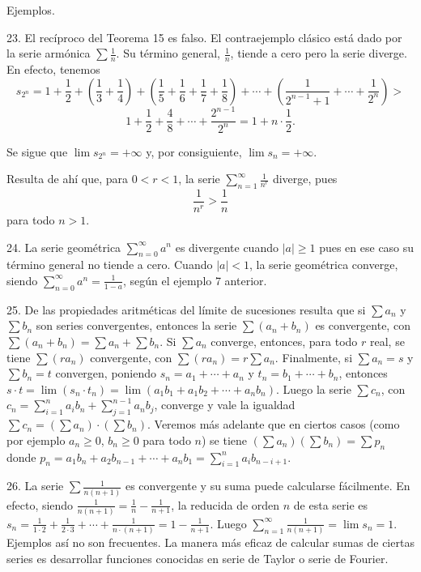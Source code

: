 \documentclass[12pt,oneside]{book}
\begin{document}
Ejemplos.

23. El recíproco del Teorema 15 es falso. El contraejemplo clásico está dado por la serie armónica \(\sum \frac{1}{n}\). Su término general, \(\frac{1}{n}\), tiende a cero pero la serie diverge. En efecto, tenemos
\[
s_{2^n} = 1 + \frac{1}{2} + \left( \frac{1}{3} + \frac{1}{4} \right)
+ \left( \frac{1}{5} + \frac{1}{6} + \frac{1}{7} + \frac{1}{8} \right) + \cdots + \left( \frac{1}{2^{n-1} + 1} + \cdots + \frac{1}{2^n} \right) >
\]
\[
1 + \frac{1}{2} + \frac{4}{8} + \cdots + \frac{2^{n-1}}{2^n} = 1 + n \cdot \frac{1}{2}.
\]

Se sigue que \(\lim s_{2^n} = +\infty\) y, por consiguiente, \(\lim s_n = +\infty\).

Resulta de ahí que, para \(0 < r < 1\), la serie \(\sum_{n=1}^{\infty} \frac{1}{n^r}\) diverge, pues
\[
\frac{1}{n^r} > \frac{1}{n}
\]
para todo \(n > 1\).

24. La serie geométrica \(\sum_{n=0}^{\infty} a^n\) es divergente cuando \(|a| \geq 1\) pues en ese caso su término general no tiende a cero. Cuando \(|a| < 1\), la serie geométrica converge, siendo \(\sum_{n=0}^{\infty} a^n = \frac{1}{1-a}\), según el ejemplo 7 anterior.

25. De las propiedades aritméticas del límite de sucesiones resulta que si \(\sum a_n\) y \(\sum b_n\) son series convergentes, entonces la serie \(\sum(a_n + b_n)\) es convergente, con \(\sum(a_n + b_n) = \sum a_n + \sum b_n\). Si \(\sum a_n\) converge, entonces, para todo \(r\) real, se tiene \(\sum(r a_n)\) convergente, con \(\sum(r a_n) = r \sum a_n\). Finalmente, si \(\sum a_n = s\) y \(\sum b_n = t\) convergen, poniendo \(s_n = a_1 + \cdots + a_n\) y \(t_n = b_1 + \cdots + b_n\), entonces \(s \cdot t = \lim(s_n \cdot t_n) = \lim(a_1 b_1 + a_1 b_2 + \cdots + a_n b_n)\). Luego la serie \(\sum c_n\), con \(c_n = \sum_{i=1}^{n} a_i b_n + \sum_{j=1}^{n-1} a_n b_j\), converge y vale la igualdad \(\sum c_n = (\sum a_n) \cdot (\sum b_n)\). Veremos más adelante que en ciertos casos (como por ejemplo \(a_n \ge 0\), \(b_n \ge 0\) para todo \(n\)) se tiene \((\sum a_n)(\sum b_n) = \sum p_n\) donde \(p_n = a_1 b_n + a_2 b_{n-1} + \cdots + a_n b_1 = \sum_{i=1}^{n} a_i b_{n-i+1}\).

26. La serie \(\sum \frac{1}{n(n+1)}\) es convergente y su suma puede calcularse fácilmente. En efecto, siendo \(\frac{1}{n(n+1)} = \frac{1}{n} - \frac{1}{n+1}\), la reducida de orden \(n\) de esta serie es \(s_n = \frac{1}{1 \cdot 2} + \frac{1}{2 \cdot 3} + \cdots + \frac{1}{n \cdot (n+1)} = 1 - \frac{1}{n+1}\). Luego \(\sum_{n=1}^{\infty} \frac{1}{n(n+1)} = \lim s_n = 1\). Ejemplos así no son frecuentes. La manera más eficaz de calcular sumas de ciertas series es desarrollar funciones conocidas en serie de Taylor o serie de Fourier.
\end{document}
